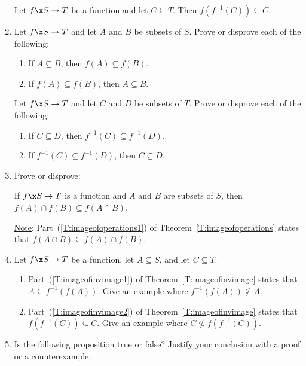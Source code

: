 \begin{enumerate}
Let $f\x S \to T$ be a function and let $C \subseteq T$.  Then 
$f \!\left( f^{-1} ( C ) \right) \subseteq C$.


\item Let $f\x S \to T$ and let $A$ and $B$ be subsets of $S$.  Prove or disprove each of the following:
\begin{enumerate}
\item If $A \subseteq B$, then $f( A ) \subseteq f( B )$.

\item If $f ( A ) \subseteq f (B )$, then $A \subseteq B$.
\end{enumerate}


\xitem \label{exer:invimagetruefalse} Let $f\x S \to T$ and let $C$ and $D$ be subsets of $T$.  Prove or disprove each of the following:
\begin{enumerate}
\item If $C \subseteq D$, then $f^{-1} ( C ) \subseteq f^{-1} (D )$.

\item If $f^{-1} ( C ) \subseteq f^{-1} (D )$, then $C \subseteq D$.
\end{enumerate}

\item Prove or disprove:

If $f\x S \to T$ is a function and  $A$ and $B$ are subsets of $S$,  then \\
$f ( A ) \cap f ( B ) \subseteq f ( A \cap B )$.

\underline{Note}:  Part~(\ref{T:imageofoperations1}) of Theorem~\ref{T:imageofoperations} states that 
$f ( A \cap B ) \subseteq f ( A ) \cap f ( B )$.

\item Let $f\x S \to T$ be a function, let $A \subseteq S$, and let $C \subseteq T$.
\label{exer:sec91-11}
\begin{enumerate}
\item Part~(\ref{T:imageofinvimage1}) of Theorem~\ref{T:imageofinvimage} states that 
$A \subseteq f^{-1} \!\left( f ( A ) \right)$.  Give an example where 
$f^{-1} \!\left( f ( A ) \right) \not \subseteq A$.

\item Part~(\ref{T:imageofinvimage2}) of Theorem~\ref{T:imageofinvimage} states that 
$f \!\left( f^{-1} ( C ) \right) \subseteq C$.  Give an example where 
$C \not \subseteq f \!\left( f^{-1} ( C ) \right)$.
\end{enumerate}

\item Is the following proposition true or false?  Justify your conclusion with a proof or a counterexample. \label{exer:sec91-12}


\end{enumerate}
